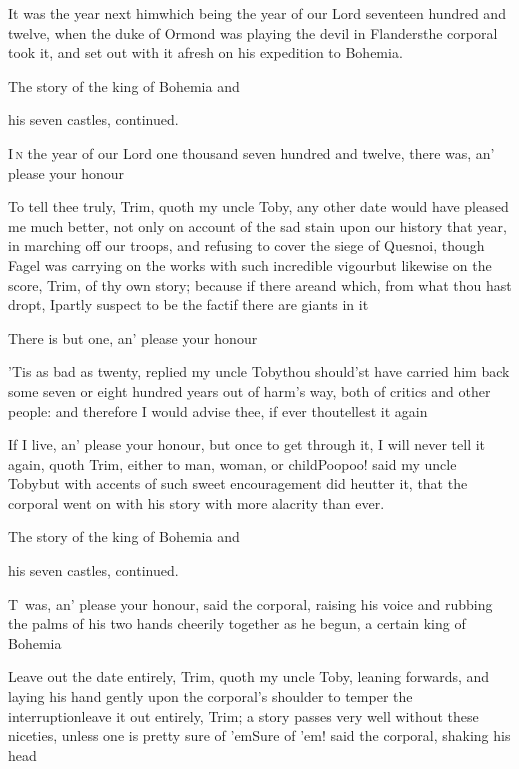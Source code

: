 \documentclass{article}
\begin{document}
\tsk It was the year next him\tsk\break which being
the year of our Lord\break 
seventeen hundred and twelve, when\break
the duke of Ormond was playing the devil in
Flanders\tsh the corporal took it, and set out with
it afresh on his expedition to Bohemia.

\newpage
\centerline{The story of the king of Bohemia and}
\centerline{his seven castles, continued.}

\lettrine{I}{\,n} the year of our Lord one thousand seven hundred and twelve, there
was, an’ please your honour\tsh

\tsh To tell thee truly, Trim, quoth my uncle
Toby, any other date would have pleased me much better, not
only on account of the sad stain upon our history that year, in
marching off our troops, and refusing to cover the siege of
Quesnoi, though Fagel was carrying on the works with
such incredible vigour\tsk but likewise on the score,
Trim, of thy own story; because if there are\tsk and
which, from what thou hast dropt, I\pb partly suspect to be the
fact\tsk if there are giants in it\tsh

There is but one, an’ please your honour\tsh

\tsh ’Tis as bad as twenty, replied my uncle
Toby\tsh thou should’st have carried him back
some seven or eight hundred years out of harm’s way, both of
critics and other people: and therefore I would advise thee, if
ever thou\break tellest it again\tsh

\tsh If I live, an’ please your honour, but once
to get through it, I will never tell it again, quoth Trim,
either to man, woman, or child\tsh Poo\tsk poo! said my uncle Toby\tsk but with accents of
such sweet encouragement did he\pb utter it, that the corporal went on
with his story with more alacrity than ever.

\bigskip
\centerline{The story of the king of Bohemia and}
\centerline{his seven castles, continued.}

\lettrine{T}{\,} was, an’ please your
honour, said the corporal, raising his voice and rubbing the palms
of his two hands cheerily together as he begun, a certain king of
Bohemia\tsh

\tsh Leave out the date entirely, Trim, quoth my
uncle Toby, leaning forwards, and laying his hand gently
upon the corporal’s shoulder to temper the
interruption\tsk leave it out entirely, Trim; a story
passes very well without these niceties, unless one is pretty sure\pb
of ’em\tsh Sure of ’em! said the corporal,
shaking his head\tsh
\end{document}
